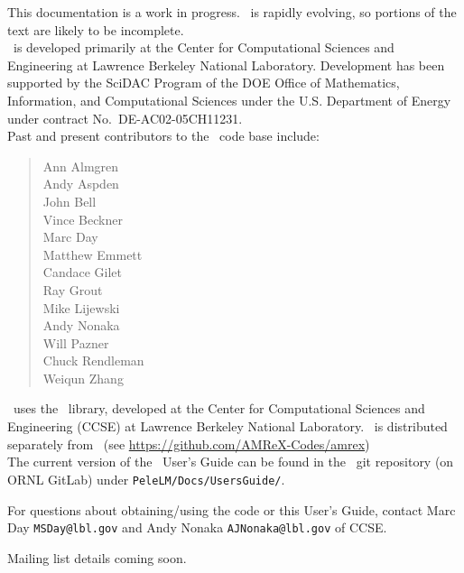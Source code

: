 This documentation is a work in progress.  \pelelm\ is rapidly
evolving, so portions of the text are likely to be incomplete. \\

\noindent \pelelm\ is developed primarily at the Center for Computational Sciences and
Engineering at Lawrence Berkeley National Laboratory.  Development has been supported
by the SciDAC Program of the DOE Office of Mathematics, Information, and Computational Sciences
under the U.S. Department of Energy under contract No.\ DE-AC02-05CH11231. \\

Past and present contributors to the \pelelm\ code base include: %
\begin{quote}
Ann Almgren\\
Andy Aspden\\
John Bell\\
Vince Beckner\\
Marc Day\\
Matthew Emmett\\
Candace Gilet\\
Ray Grout\\
Mike Lijewski\\
Andy Nonaka\\
Will Pazner\\
Chuck Rendleman\\
Weiqun Zhang\\
\end{quote}

\noindent \pelelm\ uses the \amrex\ library,
developed at the Center for Computational Sciences and Engineering (CCSE)
at Lawrence Berkeley National Laboratory.  \amrex\ is distributed
separately from \pelelm\ (see \url{https://github.com/AMReX-Codes/amrex})
\\

\noindent The current version of the \pelelm\ User's Guide can be found in 
the \pelelm\ git repository (on ORNL GitLab)
under {\tt PeleLM/Docs/UsersGuide/}.

\noindent For questions about obtaining/using the code or this 
User's Guide, contact Marc Day {\tt MSDay@lbl.gov} and Andy Nonaka 
{\tt AJNonaka@lbl.gov} of CCSE.

\noindent Mailing list details coming soon.

